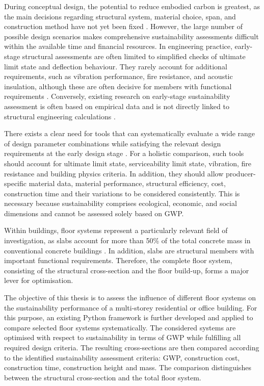 During conceptual design, the potential to reduce embodied carbon is greatest, as the main decisions regarding structural system, material choice, span, and construction method have not yet been fixed \cite{broyles2024equations}. However, the large number of possible design scenarios makes comprehensive sustainability assessments difficult within the available time and financial resources. In engineering practice, early-stage structural assessments are often limited to simplified checks of ultimate limit state and deflection behaviour. They rarely account for additional requirements, such as vibration performance, fire resistance, and acoustic insulation, although these are often decisive for members with functional requirements \cite{Ammann2024}. Conversely, existing research on early-stage sustainability assessment is often based on empirical data and is not directly linked to structural engineering calculations \cite{broyles2024equations}.

There exists a clear need for tools that can systematically evaluate a wide range of design parameter combinations while satisfying the relevant design requirements at the early design stage \cite{Kaufmann2024_WhitePaper}. For a holistic comparison, such tools should account for ultimate limit state, serviceability limit state, vibration, fire resistance and building physics criteria. In addition, they should allow producer-specific material data, material performance, structural efficiency, cost, construction time and their variations to be considered consistently. This is necessary because sustainability comprises ecological, economic, and social dimensions and cannot be assessed solely based on GWP. 

Within buildings, floor systems represent a particularly relevant field of investigation, as slabs account for more than 50\% of the total concrete mass in conventional concrete buildings \cite{DBV_Heft50_2024}. In addition, slabs are structural members with important functional requirements. Therefore, the complete floor system, consisting of the structural cross-section and the floor build-up, forms a major lever for optimisation.

The objective of this thesis is to assess the influence of different floor systems on the sustainability performance of a multi-storey residential or office building. For this purpose, an existing Python framework is further developed and applied to compare selected floor systems systematically. The considered systems are optimised with respect to sustainability in terms of GWP while fulfilling all required design criteria. The resulting cross-sections are then compared according to the identified sustainability assessment criteria: GWP, construction cost, construction time, construction height and mass. The comparison distinguishes between the structural cross-section and the total floor system.

